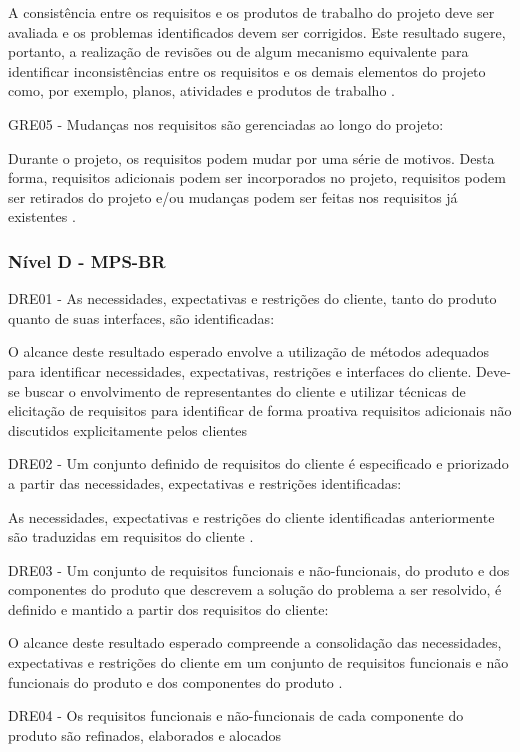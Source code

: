 	A consistência entre os requisitos e os produtos de trabalho do projeto deve ser avaliada e os problemas identificados devem
	ser corrigidos. Este resultado sugere, portanto, a realização de revisões ou de algum mecanismo equivalente para identificar
	inconsistências entre os requisitos e os demais elementos do projeto como, por exemplo, planos, atividades e produtos de
	trabalho \cite{guia2012}.

	GRE05 - Mudanças nos requisitos são gerenciadas ao longo do projeto:

	Durante o projeto, os requisitos podem mudar por uma série de motivos. Desta forma, requisitos adicionais podem ser
	incorporados no projeto, requisitos podem ser retirados do projeto e/ou mudanças podem ser feitas nos requisitos já
	existentes \cite{guia2012}.

\subsubsection{Nível D - MPS-BR}
DRE01 - As necessidades, expectativas e restrições do cliente, tanto do produto quanto de suas interfaces, são identificadas:

O alcance deste resultado esperado envolve a utilização de métodos adequados para identificar necessidades, expectativas,
restrições e interfaces do cliente. Deve-se buscar o envolvimento de representantes do cliente e utilizar técnicas de
elicitação de requisitos para identificar de forma proativa requisitos adicionais não discutidos explicitamente pelos
clientes \cite{guia2012}

DRE02 - Um conjunto definido de requisitos do cliente é especificado e priorizado a partir das necessidades, expectativas
e restrições identificadas:

As necessidades, expectativas e restrições do cliente identificadas anteriormente são traduzidas em requisitos do
cliente \cite{guia2012}.

DRE03 - Um conjunto de requisitos funcionais e não-funcionais, do produto e dos componentes do produto que descrevem a solução
 do problema a ser resolvido, é definido e mantido a partir dos requisitos do cliente:

O alcance deste resultado esperado compreende a consolidação das necessidades, expectativas e restrições do cliente em um
conjunto de requisitos funcionais e não funcionais do produto e dos componentes do produto \cite{guia2012}.

DRE04 - Os requisitos funcionais e não-funcionais de cada componente do produto são refinados, elaborados e alocados

